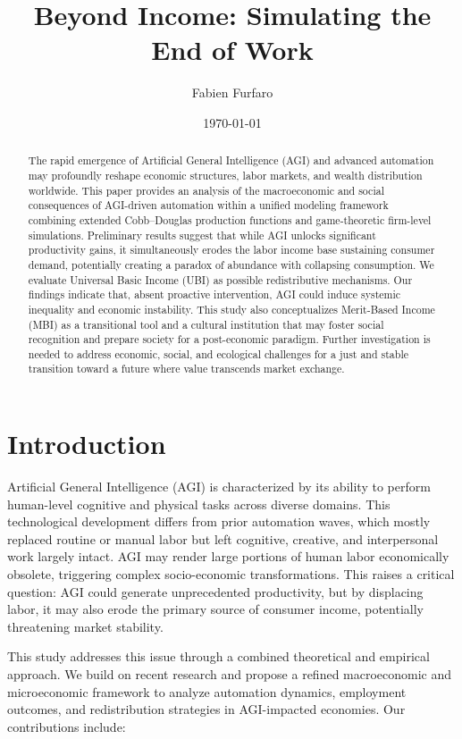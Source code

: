 \documentclass[10pt,a4paper]{article}
\title{Beyond Income: Simulating the End of Work}
\author{Fabien Furfaro}
\date{\today}
\begin{document}
\maketitle

\begin{abstract}
The rapid emergence of Artificial General Intelligence (AGI) and advanced automation may profoundly reshape economic structures, labor markets, and wealth distribution worldwide. This paper provides an analysis of the macroeconomic and social consequences of AGI-driven automation within a unified modeling framework combining extended Cobb--Douglas production functions and game-theoretic firm-level simulations. Preliminary results suggest that while AGI unlocks significant productivity gains, it simultaneously erodes the labor income base sustaining consumer demand, potentially creating a paradox of abundance with collapsing consumption. We evaluate Universal Basic Income (UBI) as possible redistributive mechanisms. Our findings indicate that, absent proactive intervention, AGI could induce systemic inequality and economic instability. This study also conceptualizes  Merit-Based Income (MBI) as a transitional tool and a cultural institution that may foster social recognition and prepare society for a post-economic paradigm. Further investigation is needed to address economic, social, and ecological challenges for a just and stable transition toward a future where value transcends market exchange.
\end{abstract}

\tableofcontents

\section{Introduction}
Artificial General Intelligence (AGI) is characterized by its ability to perform human-level cognitive and physical tasks across diverse domains. This technological development differs from prior automation waves, which mostly replaced routine or manual labor but left cognitive, creative, and interpersonal work largely intact. AGI may render large portions of human labor economically obsolete, triggering complex socio-economic transformations. This raises a critical question: AGI could generate unprecedented productivity, but by displacing labor, it may also erode the primary source of consumer income, potentially threatening market stability.

This study addresses this issue through a combined theoretical and empirical approach. We build on recent research \cite{OpenAI2023,StanfordAI2025,MIT2025} and propose a refined macroeconomic and microeconomic framework to analyze automation dynamics, employment outcomes, and redistribution strategies in AGI-impacted economies. Our contributions include:
\end{document}
